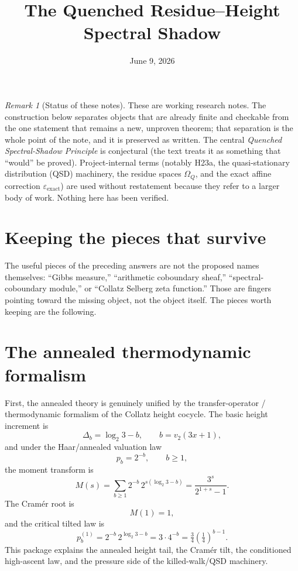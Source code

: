\documentclass[11pt]{article}
\title{The Quenched Residue--Height Spectral Shadow}
\author{}
\date{June 9, 2026}
\newcommand{\Om}{\Omega}
\theoremstyle{remark}
\newtheorem*{remark}{Remark}
\begin{document}
\maketitle

\begin{remark}[Status of these notes]
These are working research notes. The construction below separates objects that are
already finite and checkable from the one statement that remains a new, unproven theorem;
that separation is the whole point of the note, and it is preserved as written. The central
\emph{Quenched Spectral-Shadow Principle} is conjectural (the text treats it as something
that ``would'' be proved). Project-internal terms (notably \textsf{H23a}, the
quasi-stationary distribution (QSD) machinery, the residue spaces $\Om_Q$, and the exact
affine correction $\varepsilon_{\mathrm{exact}}$) are used without restatement because they
refer to a larger body of work. Nothing here has been verified.
\end{remark}

\section{Keeping the pieces that survive}

The useful pieces of the preceding answers are not the proposed names themselves:
``Gibbs measure,'' ``arithmetic coboundary sheaf,'' ``spectral-coboundary module,'' or
``Collatz Selberg zeta function.'' Those are fingers pointing toward the missing object,
not the object itself. The pieces worth keeping are the following.

\section{The annealed thermodynamic formalism}

First, the annealed theory is genuinely unified by the transfer-operator / thermodynamic
formalism of the Collatz height cocycle. The basic height increment is
\[
\Delta_b = \log_2 3 - b, \qquad b = v_2(3x+1),
\]
and under the Haar/annealed valuation law
\[
p_b = 2^{-b}, \qquad b\ge 1,
\]
the moment transform is
\[
M(s) = \sum_{b\ge1} 2^{-b}\, 2^{s(\log_2 3 - b)} = \frac{3^s}{2^{1+s}-1}.
\]
The Cram\'er root is
\[
M(1) = 1,
\]
and the critical tilted law is
\[
p_b^{(1)} = 2^{-b}\, 2^{\log_2 3 - b} = 3\cdot 4^{-b} = \tfrac34\left(\tfrac14\right)^{b-1}.
\]
This package explains the annealed height tail, the Cram\'er tilt, the conditioned
high-ascent law, and the pressure side of the killed-walk/QSD machinery.
\end{document}

